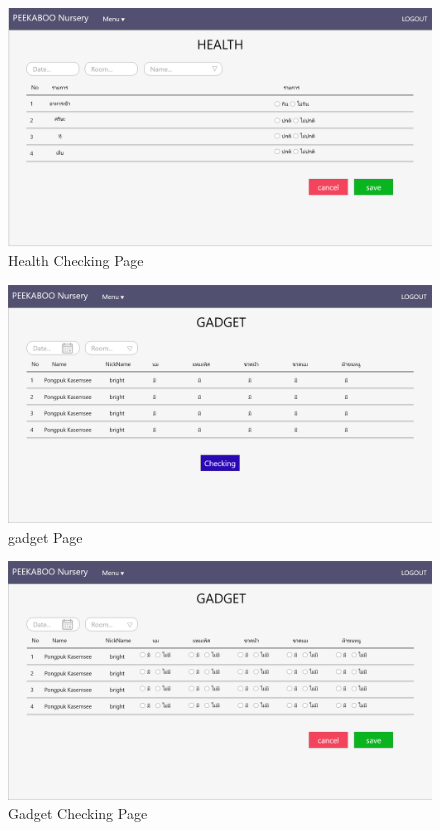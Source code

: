 \begin{figure}
  \begin{center}
  \includegraphics[width=\linewidth]{images/HealthPageChecking.png}
  \end{center}
  \caption[Poem]{Health Checking Page}
  \label{fig:CheckHealth}
  \end{figure}

\begin{figure}
  \begin{center}
  \includegraphics[width=\linewidth]{images/gadgetPage.png}
  \end{center}
  \caption[Poem]{gadget Page}
  \label{fig:Gadget}
  \end{figure}

\begin{figure}
  \begin{center}
  \includegraphics[width=\linewidth]{images/gadgetPageChecking.png}
  \end{center}
  \caption[Poem]{Gadget Checking Page}
  \label{fig:CheckGadget}
  \end{figure}


